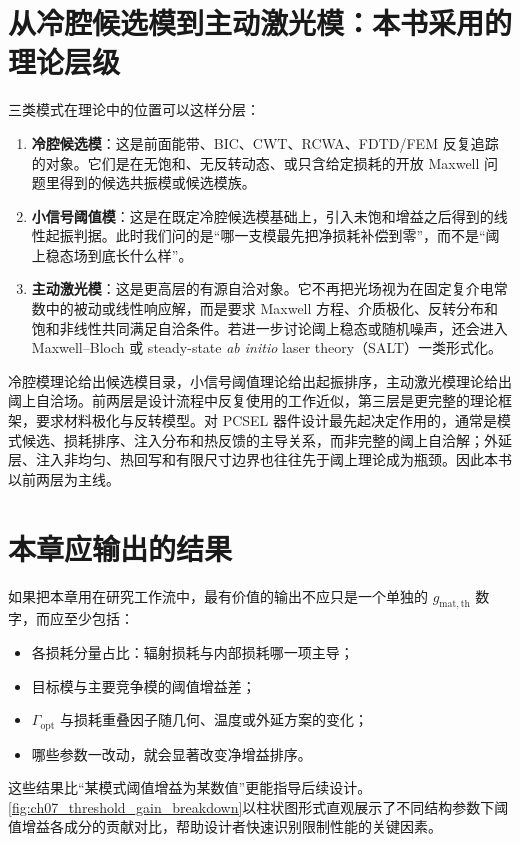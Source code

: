 \section{从冷腔候选模到主动激光模：本书采用的理论层级}
三类模式在理论中的位置可以这样分层：
\begin{enumerate}
  \item \textbf{冷腔候选模}：这是前面能带、BIC、CWT、RCWA、FDTD/FEM 反复追踪的对象。它们是在无饱和、无反转动态、或只含给定损耗的开放 Maxwell 问题里得到的候选共振模或候选模族。
  \item \textbf{小信号阈值模}：这是在既定冷腔候选模基础上，引入未饱和增益之后得到的线性起振判据。此时我们问的是“哪一支模最先把净损耗补偿到零”，而不是“阈上稳态场到底长什么样”。
  \item \textbf{主动激光模}：这是更高层的有源自洽对象。它不再把光场视为在固定复介电常数中的被动或线性响应解，而是要求 Maxwell 方程、介质极化、反转分布和饱和非线性共同满足自洽条件。若进一步讨论阈上稳态或随机噪声，还会进入 Maxwell--Bloch 或 steady-state \emph{ab initio} laser theory（SALT）一类形式化\cite{tureci2007salt,tureci2009salt}。
\end{enumerate}

冷腔模理论给出候选模目录，小信号阈值理论给出起振排序，主动激光模理论给出阈上自洽场。前两层是设计流程中反复使用的工作近似，第三层是更完整的理论框架，要求材料极化与反转模型。对 PCSEL 器件设计最先起决定作用的，通常是模式候选、损耗排序、注入分布和热反馈的主导关系，而非完整的阈上自洽解；外延层、注入非均匀、热回写和有限尺寸边界也往往先于阈上理论成为瓶颈。因此本书以前两层为主线。

\section{本章应输出的结果}
如果把本章用在研究工作流中，最有价值的输出不应只是一个单独的 $g_{\mathrm{mat,th}}$ 数字，而应至少包括：
\begin{itemize}
  \item 各损耗分量占比：辐射损耗与内部损耗哪一项主导；
  \item 目标模与主要竞争模的阈值增益差；
  \item $\Gamma_{\mathrm{opt}}$ 与损耗重叠因子随几何、温度或外延方案的变化；
  \item 哪些参数一改动，就会显著改变净增益排序。
\end{itemize}
这些结果比“某模式阈值增益为某数值”更能指导后续设计。\cref{fig:ch07_threshold_gain_breakdown}以柱状图形式直观展示了不同结构参数下阈值增益各成分的贡献对比，帮助设计者快速识别限制性能的关键因素。

